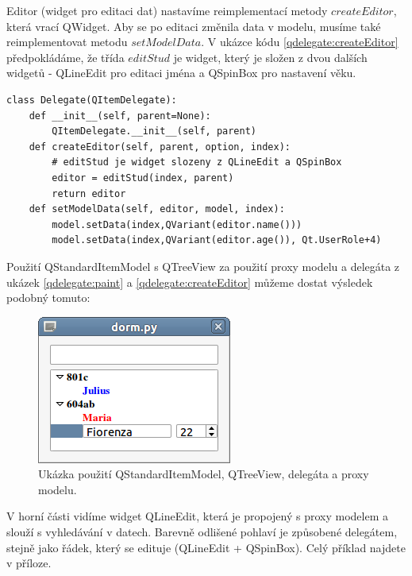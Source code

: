 Editor (widget pro editaci dat) nastavíme reimplementací metody $createEditor$, která vrací QWidget. Aby se po editaci změnila data v modelu, musíme také reimplementovat metodu $setModelData$. V ukázce kódu \ref{qdelegate:createEditor} předpokládáme, že třída $editStud$ je widget, který je složen z dvou dalších widgetů - QLineEdit pro editaci jména a QSpinBox pro nastavení věku. \\

\begin{lstlisting}[label=qdelegate:createEditor,caption={Delegate - přepsání metod $createEditor$ a $setModelData$}, morekeywords={QItemDelegate, Qt, QFont, AlignLeft, DisplayRole, UserRole, QPen}]
class Delegate(QItemDelegate):
    def __init__(self, parent=None):
        QItemDelegate.__init__(self, parent)
    def createEditor(self, parent, option, index):
    	# editStud je widget slozeny z QLineEdit a QSpinBox
        editor = editStud(index, parent)
        return editor    
    def setModelData(self, editor, model, index):
        model.setData(index,QVariant(editor.name()))
        model.setData(index,QVariant(editor.age()), Qt.UserRole+4)
\end{lstlisting}

Použití QStandardItemModel s QTreeView za použití proxy modelu a delegáta z ukázek \ref{qdelegate:paint} a \ref{qdelegate:createEditor} můžeme dostat výsledek podobný tomuto:

\begin{figure}[h]
	\centering
	\includegraphics[scale=0.7]{pictures/qt/dorm}
	\caption{Ukázka použití QStandardItemModel, QTreeView, delegáta a proxy modelu.}
	\label{pic:delegate}
\end{figure} 

\noindent
V horní části vidíme widget QLineEdit, která je propojený s proxy modelem a slouží s vyhledávání v datech. Barevně odlišené pohlaví je způsobené delegátem, stejně jako řádek, který se edituje (QLineEdit + QSpinBox). Celý příklad najdete v příloze.

